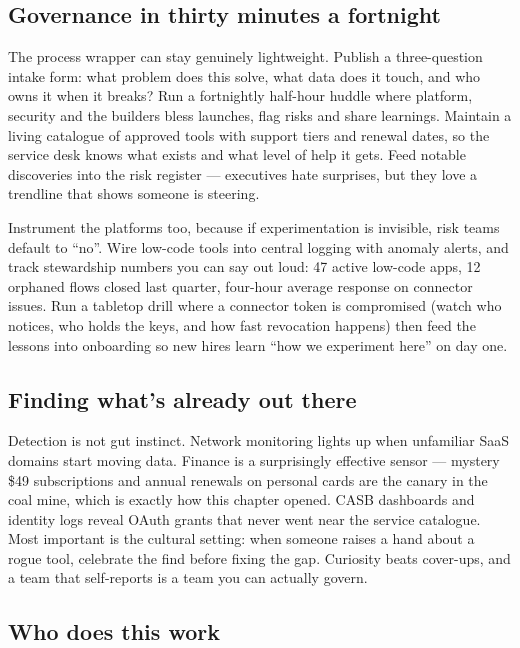 \subsection{Governance in thirty minutes a fortnight}


The process wrapper can stay genuinely lightweight. Publish a three-question intake form: what problem does this solve, what data does it touch, and who owns it when it breaks? Run a fortnightly half-hour huddle where platform, security and the builders bless launches, flag risks and share learnings. Maintain a living catalogue of approved tools with support tiers and renewal dates, so the service desk knows what exists and what level of help it gets. Feed notable discoveries into the risk register — executives hate surprises, but they love a trendline that shows someone is steering.


Instrument the platforms too, because if experimentation is invisible, risk teams default to ``no''. Wire low-code tools into central logging with anomaly alerts, and track stewardship numbers you can say out loud: 47 active low-code apps, 12 orphaned flows closed last quarter, four-hour average response on connector issues. Run a tabletop drill where a connector token is compromised (watch who notices, who holds the keys, and how fast revocation happens) then feed the lessons into onboarding so new hires learn ``how we experiment here'' on day one.



\subsection{Finding what's already out there}


Detection is not gut instinct. Network monitoring lights up when unfamiliar SaaS domains start moving data. Finance is a surprisingly effective sensor — mystery \$49 subscriptions and annual renewals on personal cards are the canary in the coal mine, which is exactly how this chapter opened. CASB dashboards and identity logs reveal OAuth grants that never went near the service catalogue. Most important is the cultural setting: when someone raises a hand about a rogue tool, celebrate the find before fixing the gap. Curiosity beats cover-ups, and a team that self-reports is a team you can actually govern.



\subsection{Who does this work}


